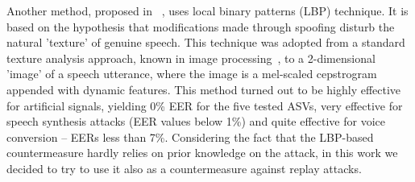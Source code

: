 



Another method, proposed in ~\cite{Alegre2013a}, uses local binary patterns (LBP) technique. It is based on the hypothesis that modifications made through spoofing disturb the natural 'texture' of genuine speech. This technique was adopted from a standard texture analysis approach, known in image processing~\cite{Ojala2002}, to a 2-dimensional 'image' of a speech utterance, where the image is a mel-scaled cepstrogram appended with dynamic features. This method turned out to be  highly effective for artificial signals, yielding 0\% EER for the five tested ASVs, very effective for speech synthesis attacks (EER values below 1\%) and quite effective for voice conversion -- EERs less than 7\%. Considering the fact that the LBP-based countermeasure hardly relies on prior knowledge on the attack, in this work we decided to try to use it also as a countermeasure against replay attacks.




